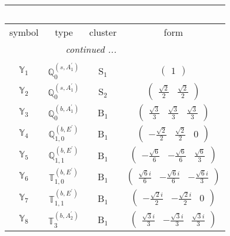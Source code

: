 \documentclass[fleqn,10pt,landscape]{article}
\begin{document}
\begin{itemize}
\begin{center}
\begin{longtable}{c|c|c|c}
\multicolumn{3}{l}{\tablename\ \thetable{}} \\
 \hline \hline
symbol & type & cluster & form \\ \hline \endhead

 \hline \hline
\multicolumn{3}{r}{\footnotesize\it continued ...} \\ \endfoot

 \hline \hline
\multicolumn{3}{r}{} \\ \endlastfoot

$ \mathbb{Y}_{1} $ & $\mathbb{Q}_{0}^{(s,A_{1}^{\prime})}$ & S$_{1}$ & $\begin{pmatrix} 1 \end{pmatrix}$ \\ \hline
$ \mathbb{Y}_{2} $ & $\mathbb{Q}_{0}^{(s,A_{1}^{\prime})}$ & S$_{2}$ & $\begin{pmatrix} \frac{\sqrt{2}}{2} & \frac{\sqrt{2}}{2} \end{pmatrix}$ \\ \hline
$ \mathbb{Y}_{3} $ & $\mathbb{Q}_{0}^{(b,A_{1}^{\prime})}$ & B$_{1}$ & $\begin{pmatrix} \frac{\sqrt{3}}{3} & \frac{\sqrt{3}}{3} & \frac{\sqrt{3}}{3} \end{pmatrix}$ \\
$ \mathbb{Y}_{4} $ & $\mathbb{Q}_{1,0}^{(b,E^{\prime})}$ & B$_{1}$ & $\begin{pmatrix} - \frac{\sqrt{2}}{2} & \frac{\sqrt{2}}{2} & 0 \end{pmatrix}$ \\
$ \mathbb{Y}_{5} $ & $\mathbb{Q}_{1,1}^{(b,E^{\prime})}$ & B$_{1}$ & $\begin{pmatrix} - \frac{\sqrt{6}}{6} & - \frac{\sqrt{6}}{6} & \frac{\sqrt{6}}{3} \end{pmatrix}$ \\
$ \mathbb{Y}_{6} $ & $\mathbb{T}_{1,0}^{(b,E^{\prime})}$ & B$_{1}$ & $\begin{pmatrix} \frac{\sqrt{6} i}{6} & - \frac{\sqrt{6} i}{6} & - \frac{\sqrt{6} i}{3} \end{pmatrix}$ \\
$ \mathbb{Y}_{7} $ & $\mathbb{T}_{1,1}^{(b,E^{\prime})}$ & B$_{1}$ & $\begin{pmatrix} - \frac{\sqrt{2} i}{2} & - \frac{\sqrt{2} i}{2} & 0 \end{pmatrix}$ \\
$ \mathbb{Y}_{8} $ & $\mathbb{T}_{3}^{(b,A_{2}^{\prime})}$ & B$_{1}$ & $\begin{pmatrix} \frac{\sqrt{3} i}{3} & - \frac{\sqrt{3} i}{3} & \frac{\sqrt{3} i}{3} \end{pmatrix}$ \\ \hline

\end{longtable}
\end{center}
\end{itemize}
\end{document}
